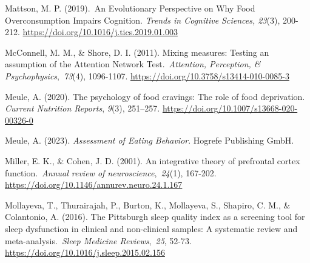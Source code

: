 \documentclass[authordate, empirical]{jote-new-article}
\begin{document}
Mattson, M. P. (2019). An Evolutionary Perspective on Why Food Overconsumption Impairs Cognition.\emph{ Trends in Cognitive Sciences, 23}(3), 200-212. \url{https://doi.org/10.1016/j.tics.2019.01.003}









McConnell, M. M., \& Shore, D. I. (2011). Mixing measures: Testing an assumption of the Attention Network Test. \emph{Attention, Perception, \& Psychophysics}, \emph{73}(4), 1096-1107. \url{https://doi.org/10.3758/s13414-010-0085-3}



Meule, A. (2020). The psychology of food cravings: The role of food deprivation. \emph{Current Nutrition Reports}, \emph{9}(3), 251--257. \href{https://doi.org/10.1007/s13668-020-00326-0}{https://doi.org/10.1007/s13668-020-00326-0}



Meule, A. (2023). \emph{Assessment of Eating Behavior}. Hogrefe Publishing GmbH.



Miller, E. K., \& Cohen, J. D. (2001). An integrative theory of prefrontal cortex function. \emph{Annual review of neuroscience}, \emph{24}(1), 167-202. \url{https://doi.org/10.1146/annurev.neuro.24.1.167}






Mollayeva, T., Thurairajah, P., Burton, K., Mollayeva, S., Shapiro, C. M., \& Colantonio, A. (2016). The Pittsburgh sleep quality index as a screening tool for sleep dysfunction in clinical and non-clinical samples: A systematic review and meta-analysis. \emph{Sleep Medicine Reviews}, \emph{25}, 52-73. \url{https://doi.org/10.1016/j.sleep.2015.02.156}
\end{document}
